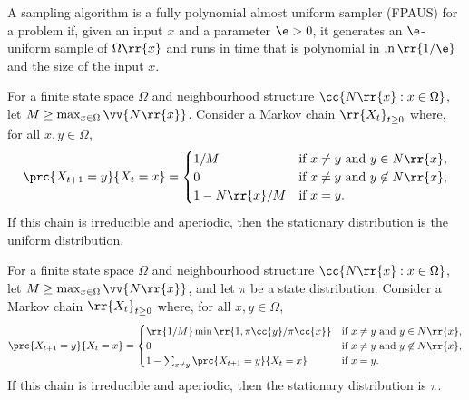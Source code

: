\documentclass{article}
\begin{document}
\begin{definition}
  A sampling algorithm is a fully polynomial almost uniform sampler (FPAUS) for a
  problem if, given an input $x$ and a parameter $\e>0$, it generates an $\e$-uniform
  sample of $\Omega\rr{x}$ and runs in time that is polynomial in $\ln\rr{1/\e}$ and the
  size of the input $x$.
\end{definition}

\begin{lemma}
  For a finite state space $\Omega$ and neighbourhood structure $\cc{N\rr{x} : x\in\Omega}$,
  let $M\geq\max_{x\in\Omega}\vv{N\rr{x}}$. Consider a Markov chain $\rr{X_t}_{t\geq 0}$
  where, for all $x,y\in\Omega$,
  \begin{align*}
    \prc{X_{t+1}=y}{X_t=x} =
    \begin{cases}
      1/M &\text{if $x\neq y$ and $y\in N\rr{x}$}, \\
      0 &\text{if $x\neq y$ and $y\not\in N\rr{x}$}, \\
      1-N\rr{x}/M &\text{if $x=y$}.
    \end{cases}
  \end{align*}
  If this chain is irreducible and aperiodic, then the stationary distribution is
  the uniform distribution.
\end{lemma}

\begin{lemma}[Metropolis]
  For a finite state space $\Omega$ and neighbourhood structure $\cc{N\rr{x} : x\in\Omega}$,
  let $M\geq\max_{x\in\Omega}\vv{N\rr{x}}$, and let $\pi$ be a state distribution.
  Consider a Markov chain $\rr{X_t}_{t\geq 0}$ where, for all $x,y\in\Omega$,
  \begin{align*}
    \prc{X_{t+1}=y}{X_t=x} =
    \begin{cases}
      \rr{1/M}\min\rr{1,\pi\cc{y}/\pi\cc{x}} &\text{if $x\neq y$ and $y\in N\rr{x}$}, \\
      0                                      &\text{if $x\neq y$ and $y\not\in N\rr{x}$}, \\
      1-\sum_{x\neq y}\prc{X_{t+1}=y}{X_t=x} &\text{if $x=y$}.
    \end{cases}
  \end{align*}
  If this chain is irreducible and aperiodic, then the stationary distribution is $\pi$.
\end{lemma}
\end{document}
